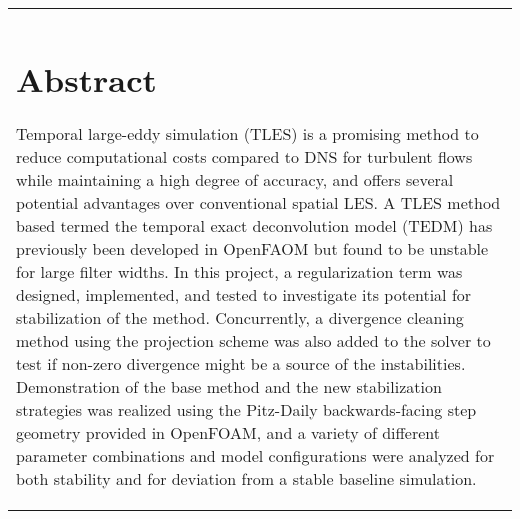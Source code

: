 \begin{tabular}{p{}}
\chapter*{Abstract}

Temporal large-eddy simulation (TLES) is a promising method to reduce computational costs compared to DNS for turbulent flows while maintaining a high degree of accuracy, and offers several potential advantages over conventional spatial LES. A TLES method based termed the temporal exact deconvolution model (TEDM) has previously been developed in OpenFAOM but found to be unstable for large filter widths. In this project, a regularization term was designed, implemented, and tested to investigate its potential for stabilization of the method. Concurrently, a divergence cleaning method using the projection scheme was also added to the solver to test if non-zero divergence might be a source of the instabilities. Demonstration of the base method and the new stabilization strategies was realized using the Pitz-Daily backwards-facing step geometry provided in OpenFOAM, and a variety of different parameter combinations and model configurations were analyzed for both stability and for deviation from a stable baseline simulation.

\end{tabular}
